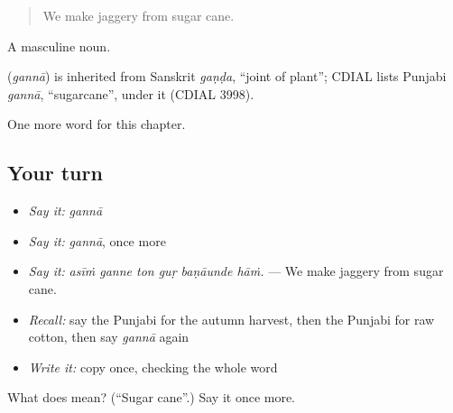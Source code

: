 \begin{quote}
We make jaggery from sugar cane.
\end{quote}

A masculine noun.

\begin{cousinweb}
\textbf{} (\emph{gannā}) is inherited from Sanskrit \emph{gaṇḍa}, \textquotedblleft{}joint of plant\textquotedblright{}; CDIAL lists Punjabi \emph{gannā}, \textquotedblleft{}sugarcane\textquotedblright{}, under it (CDIAL 3998).
\end{cousinweb}

\begin{grammarlens}[title={What you've built}]
One more word for this chapter.
\end{grammarlens}

\subsection*{Your turn}
\begin{itemize}
\raggedright
  \item \emph{Say it:} \emph{gannā}
  \item \emph{Say it:} \emph{gannā}, once more
  \item \emph{Say it:} \emph{asīṁ ganne ton guṛ baṇāunde hāṁ.} — We make jaggery from sugar cane.
  \item \emph{Recall:} say the Punjabi for the autumn harvest, then the Punjabi for raw cotton, then say \emph{gannā} again
  \item \emph{Write it:} copy \textbf{} once, checking the whole word
\end{itemize}

\begin{tcolorbox}[breakable,colback=teal!4,colframe=teal!35!black,title={Before you move on}]
What does  mean? (\textquotedblleft{}Sugar cane\textquotedblright{}.) Say it once more.
\end{tcolorbox}
